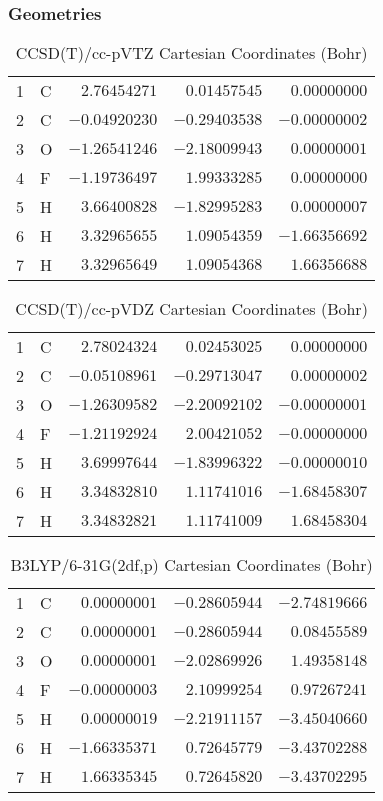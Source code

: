 \documentclass[10pt,oneside]{article}
\begin{document}
\subsubsection*{Geometries}
\begin{table}[h!]
\centering
\caption{CCSD(T)/cc-pVTZ Cartesian Coordinates (Bohr)}
\begin{tabular}{llrrr}
1  & C  & $ 2.76454271$ & $ 0.01457545$ & $ 0.00000000$ \\
2  & C  & $-0.04920230$ & $-0.29403538$ & $-0.00000002$ \\
3  & O  & $-1.26541246$ & $-2.18009943$ & $ 0.00000001$ \\
4  & F  & $-1.19736497$ & $ 1.99333285$ & $ 0.00000000$ \\
5  & H  & $ 3.66400828$ & $-1.82995283$ & $ 0.00000007$ \\
6  & H  & $ 3.32965655$ & $ 1.09054359$ & $-1.66356692$ \\
7  & H  & $ 3.32965649$ & $ 1.09054368$ & $ 1.66356688$ \\
\end{tabular}
\end{table}

\begin{table}[h!]
\centering
\caption{CCSD(T)/cc-pVDZ Cartesian Coordinates (Bohr)}
\begin{tabular}{llrrr}
1  & C  & $ 2.78024324$ & $ 0.02453025$ & $ 0.00000000$ \\
2  & C  & $-0.05108961$ & $-0.29713047$ & $ 0.00000002$ \\
3  & O  & $-1.26309582$ & $-2.20092102$ & $-0.00000001$ \\
4  & F  & $-1.21192924$ & $ 2.00421052$ & $-0.00000000$ \\
5  & H  & $ 3.69997644$ & $-1.83996322$ & $-0.00000010$ \\
6  & H  & $ 3.34832810$ & $ 1.11741016$ & $-1.68458307$ \\
7  & H  & $ 3.34832821$ & $ 1.11741009$ & $ 1.68458304$ \\
\end{tabular}
\end{table}

\begin{table}[h!]
\centering
\caption{B3LYP/6-31G(2df,p) Cartesian Coordinates (Bohr)}
\begin{tabular}{llrrr}
1  & C  & $ 0.00000001$ & $-0.28605944$ & $-2.74819666$ \\
2  & C  & $ 0.00000001$ & $-0.28605944$ & $ 0.08455589$ \\
3  & O  & $ 0.00000001$ & $-2.02869926$ & $ 1.49358148$ \\
4  & F  & $-0.00000003$ & $ 2.10999254$ & $ 0.97267241$ \\
5  & H  & $ 0.00000019$ & $-2.21911157$ & $-3.45040660$ \\
6  & H  & $-1.66335371$ & $ 0.72645779$ & $-3.43702288$ \\
7  & H  & $ 1.66335345$ & $ 0.72645820$ & $-3.43702295$ \\
\end{tabular}
\end{table}
\end{document}
